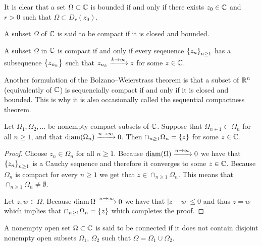 \documentclass[11pt,a4paper]{article}
\begin{document}
\begin{remark}
  It is clear that a set $\Omega \subset \mathbb{C}$ is bounded if and only if
  there exists $z_0 \in \mathbb{C}$ and $r > 0$ such that $\Omega \subset D_r(z_0)$.
\end{remark}

\begin{definition}
  A subset $\Omega$ of $\mathbb{C}$ is said to be compact if it is closed and 
  bounded.
\end{definition}

\begin{theorem}
  A subset $\Omega$ in $\mathbb{C}$ is compact if and only if every seqeuence
  $\left\{z_n\right\}_{n \geq 1}$ has a subsequence $\left\{z_{n_k}\right\}$ such that
  $z_{n_k} \xrightarrow{k \to \infty} z$ for some $z \in \mathbb{C}$.
\end{theorem}
\begin{remark}
  Another formulation of the Bolzano--Weierstrass theorem is that a subset
  of $\mathbb{R}^n$ (equivalently of $\mathbb{C}$) is sequencially compact if and only if
  it is closed and bounded.
  This is why it is also occasionally called
  the sequential compactness theorem.
\end{remark}

\begin{theorem}
  Let $\Omega_1, \Omega_2, \dots$ be nonempty compact subsets of $\mathbb{C}$.
  Suppose that $\Omega_{n+1} \subset \Omega_n$ for all $n \geq 1$,
  and that $\operatorname{diam}(\Omega_n) \xrightarrow{n \to \infty} 0$.
  Then $\cap_{n \geq 1} \Omega_n = \left\{z\right\}$ for some $z \in \mathbb{C}$.
\end{theorem}
\begin{proof}
  Choose $z_n \in \Omega_n$ for all $n \geq 1$.
  Because $\operatorname{diam}(\Omega) \xrightarrow{n \to \infty} 0$ we have that
  $\left\{z_n\right\}_{n \geq 1}$ is a Cauchy sequence and therefore it converges
  to some $z \in \mathbb{C}$. Because $\Omega_n$ is compact for every $n \geq 1$
  we get that $z \in \cap_{n \geq 1} \Omega_n$.
  This means that $\cap_{n \geq 1} \Omega_n \neq \emptyset$.

  Let $z,w \in \Omega$.
  Because $\operatorname{diam} \Omega \xrightarrow{n \to \infty} 0$ we have that
  $|z - w| \le 0$ and thus $z = w$ which implies that
  $\cap_{n \geq 1} \Omega_n = \left\{z\right\}$ which completes the proof.
\end{proof}

\begin{definition}
  A nonempty open set $\Omega \subset \mathbb{C}$ is said to be connected if it does
  not contain disjoint nonempty open subsets $\Omega_1$, $\Omega_2$ such
  that $\Omega = \Omega_1 \cup \Omega_2$.
\end{definition}
\end{document}
